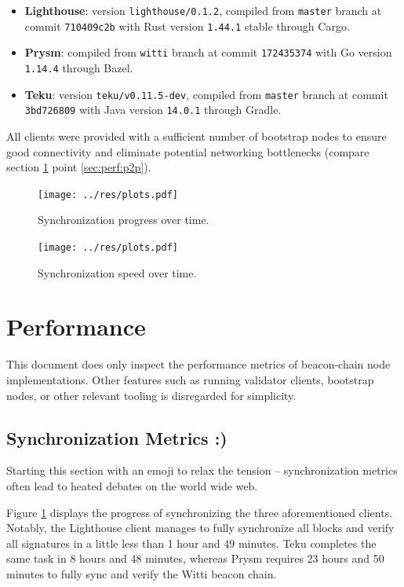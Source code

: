 \documentclass[twoside,twocolumn]{article}
\begin{document}
\begin{itemize}
\item \textbf{Lighthouse}: version \texttt{lighthouse/0.1.2}, compiled from \texttt{master} branch at commit \texttt{710409c2b} with Rust version \texttt{1.44.1} stable through Cargo.
\item \textbf{Prysm}: compiled from \texttt{witti} branch at commit \texttt{172435374} with Go version \texttt{1.14.4} through Bazel.
\item \textbf{Teku}: version \texttt{teku/v0.11.5-dev}, compiled from \texttt{master} branch at commit \texttt{3bd726809} with Java version \texttt{14.0.1} through Gradle.
\end{itemize}

All clients were provided with a sufficient number of bootstrap nodes to ensure good connectivity and eliminate potential networking bottlenecks (compare section \ref{sec:perf} point \ref{sec:perf:p2p}).\par

\begin{figure}[t]
	\centering
	\texttt{[image: ../res/plots.pdf]}
	\caption{Synchronization progress over time.}
	\label{img:sync:prog}
\end{figure}

\begin{figure}[t]
	\centering
	\texttt{[image: ../res/plots.pdf]}
	\caption{Synchronization speed over time.}
	\label{img:sync:sped}
\end{figure}

\section{Performance}
\label{sec:perf}
This document does only inspect the performance metrics of beacon-chain node implementations. Other features such as running validator clients, bootstrap nodes, or other relevant tooling is disregarded for simplicity.

\subsection{Synchronization Metrics :)}
Starting this section with an emoji to relax the tension -- synchronization metrics often lead to heated debates on the world wide web.\par

Figure \ref{img:sync:prog} displays the progress of synchronizing the three aforementioned clients. Notably, the Lighthouse client manages to fully synchronize all blocks and verify all signatures in a little less than 1 hour and 49 minutes. Teku completes the same task in 8 hours and 48 minutes, whereas Prysm requires 23 hours and 50 minutes to fully sync and verify the Witti beacon chain.\par
\end{document}
